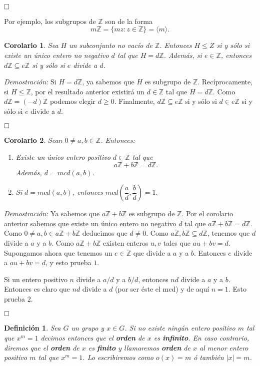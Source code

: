 \documentclass[12pt]{article}
\newtheorem{definition}[theorem]{Definición}
\newtheorem{corolario}{Corolario}[theorem]
\begin{document}
$\hfill \square$

Por ejemplo, los subgrupos de $\mathbb{Z}$ son de la forma $$m\mathbb{Z} = \lbrace mz : z \in \mathbb{Z} \rbrace = \langle m \rangle.$$

\begin{corolario}Sea $H$ un subconjunto no vacío de $\mathbb{Z}$. Entonces $H \leq Z$ si y sólo si existe un único entero no negativo $d$ tal que $H = d\mathbb{Z}$. Además, si $e \in \mathbb{Z}$, entonces $d\mathbb{Z} \subseteq e\mathbb{Z}$ si y sólo si $e$ divide a $d$.
\end{corolario}
\emph{Demostración: }Si $H = d\mathbb{Z}$, ya sabemos que $H$ es subgrupo de $\mathbb{Z}$. Recíprocamente, si $H \leq \mathbb{Z}$, por el resultado anterior existirá un $d \in \mathbb{Z}$ tal que $H = d\mathbb{Z}$. Como $d\mathbb{Z} = (-d)\mathbb{Z}$ podemos elegir $d \geq 0$. Finalmente, $d\mathbb{Z} \subseteq e\mathbb{Z}$ si y sólo si $d \in e\mathbb{Z}$ si y sólo si $e$ divide a $d$.

$\hfill \square$

\begin{corolario}Sean $0\neq a,b \in \mathbb{Z}$. Entonces:
\begin{enumerate}
\item Existe un único entero positivo $d \in \mathbb{Z}$ tal que $$a\mathbb{Z}+b\mathbb{Z} = d\mathbb{Z}.$$ Además, $d = mcd(a,b)$.
\item Si $d = mcd(a,b)$, entonces $mcd \left(\dfrac{a}{d}, \dfrac{b}{d} \right) = 1.$
\end{enumerate}
\end{corolario}
\emph{Demostración: }Ya sabemos que $a\mathbb{Z}+b\mathbb{Z}$ es subgrupo de $\mathbb{Z}$. Por el corolario anterior sabemos que existe un único entero no negativo $d$ tal que $a\mathbb{Z}+b\mathbb{Z} = d\mathbb{Z}$. Como $0\neq a,b \in a\mathbb{Z}+b\mathbb{Z}$ deducimos que $d\neq 0$. Como $a\mathbb{Z}, b\mathbb{Z} \subseteq d\mathbb{Z}$, tenemos que $d$ divide a $a$ y a $b$. Como $a\mathbb{Z}+b\mathbb{Z}$ existen enteros $u,v$ tales que $au+bv = d$. Supongamos ahora que tenemos un $e\in \mathbb{Z}$ que divide a $a$ y a $b$. Entonces $e$ divide a $au+bv = d$, y esto prueba $1.$

Si un entero positivo $n$ divide a $a/d$ y a $b/d$, entonces $nd$ divide a $a$ y a $b$. Entonces es claro que $nd$ divide a $d$ (por ser éste el mcd) y de aquí $n=1$. Esto prueba $2.$

$\hfill \square$

\begin{definition}Sea $G$ un grupo y $x \in G$. Si no existe ningún entero positivo $m$ tal que $x^m=1$ decimos entonces que el \textbf{orden} de $x$ es \textbf{infinito}. En caso contrario, diremos que el \textbf{orden} de $x$ es \textbf{finito} y llamaremos \textbf{orden} de $x$ al menor entero positivo $m$ tal que $x^m =1$. Lo escribiremos como $o(x) = m$ ó también $|x| = m$.
\end{definition}
\end{document}
